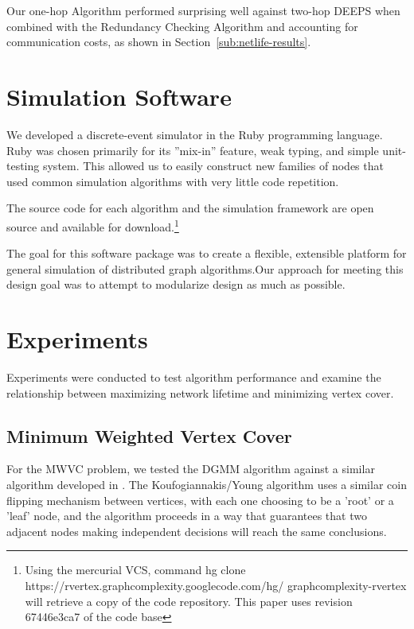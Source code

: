 Our one-hop Algorithm performed surprising well against two-hop DEEPS when combined with the Redundancy Checking Algorithm and accounting for communication costs, as shown in Section~\ref{sub:netlife-results}.




\section{Simulation Software}
\label{sec:simulator}

We developed a discrete-event simulator in the Ruby programming language. Ruby was chosen primarily for its ''mix-in'' feature, weak typing, and simple unit-testing system. This allowed us to easily construct new families of nodes that used common simulation algorithms with very little code repetition.

The source code for each algorithm and the simulation framework are open source and available for download.\footnote{Using the mercurial VCS, command hg clone https://rvertex.graphcomplexity.googlecode.com/hg/ graphcomplexity-rvertex will retrieve a copy of the code repository. This paper uses revision 67446e3ca7 of the code base} 

The goal for this software package was to create a flexible, extensible platform for general simulation of distributed graph algorithms.Our approach for meeting this design goal was to attempt to modularize design as much as possible.

\section{Experiments}
\label{sec:experiments}
Experiments were conducted to test algorithm performance and examine the relationship between maximizing network lifetime and minimizing vertex cover.
\subsection{Minimum Weighted Vertex Cover}
\label{sub:mwvc-exp}

For the MWVC problem, we tested the DGMM algorithm against a similar algorithm developed in \cite{1582746}. The Koufogiannakis/Young algorithm uses a similar coin flipping mechanism between vertices, with each one choosing to be a 'root' or a 'leaf' node, and the algorithm proceeds in a way that guarantees that two adjacent nodes making independent decisions will reach the same conclusions. 

